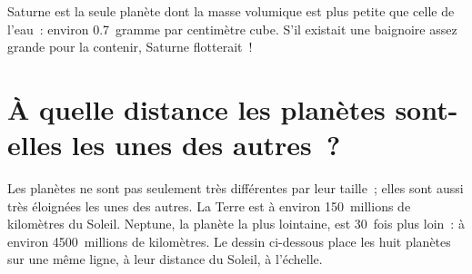 \begin{remark}\label{rem:g6:earth-a-planet:saturn}
Saturne est la seule planète dont la masse volumique est plus petite que
celle de l'eau~: environ 0.7~gramme par centimètre cube. S'il existait une
baignoire assez grande pour la contenir, Saturne flotterait~!
\end{remark}

\section{À quelle distance les planètes sont-elles les unes des autres~?}

Les planètes ne sont pas seulement très différentes par leur taille~; elles
sont aussi très éloignées les unes des autres. La Terre est à environ
150~millions de kilomètres du Soleil. Neptune, la planète la plus
lointaine, est 30~fois plus loin~: à environ 4500~millions de kilomètres.
Le dessin ci-dessous place les huit planètes sur une même ligne, à leur
distance du Soleil, à l'échelle.

